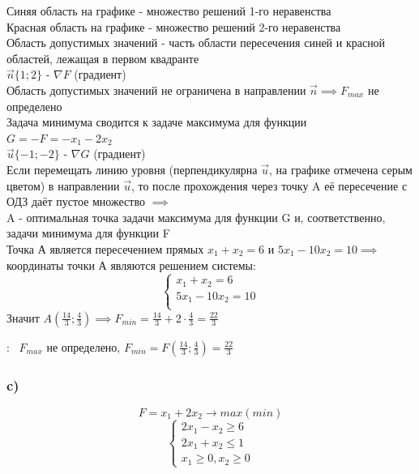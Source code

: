 \begin{flushleft}
    Синяя область на графике - множество решений 1-го неравенства\\
    Красная область на графике - множество решений 2-го неравенства\\
    Область допустимых значений - часть области пересечения синей и красной областей, лежащая в первом квадранте\\
    $\vec{n}\{1; 2\}$ - $\nabla F$ (градиент)\\
    Область допустимых значений не ограничена в направлении $\vec{n} \implies F_{max}$ не определено\\
    Задача минимума сводится к задаче максимума для функции $G = -F = -x_1 - 2x_2$ \\
    $\vec{u}\{-1; -2\}$ - $\nabla G$ (градиент)\\
    Если перемещать линию уровня (перпендикулярна $\vec{u}$, на графике отмечена серым цветом) в направлении $\vec{u}$, то после прохождения через точку A её пересечение с ОДЗ даёт пустое множество $\implies$ \\A - оптимальная точка задачи максимума для функции G и, соответственно, задачи минимума для функции F\\
    Точка А является пересечением прямых $x_1 + x_2 = 6$ и $5x_1 - 10x_2 = 10 \implies$ координаты точки А являются решением системы:\\
    \begin{equation*}
        \begin{cases}
            x_1 + x_2 = 6 \\
            5x_1 - 10x_2 = 10 \\
        \end{cases}
    \end{equation*}
    Значит $A(\frac{14}{3}; \frac{4}{3}) \implies F_{min} = \frac{14}{3} + 2\cdot\frac{4}{3} = \frac{22}{3}$
\end{flushleft}

{:~} $F_{max}$ не определено,  $F_{min} = F(\frac{14}{3}; \frac{4}{3}) = \frac{22}{3}$ 



\subsubsection{c)}
\begin{equation*}
    F = x_1 + 2x_2 \rightarrow max(min)
\end{equation*}
\begin{equation*}
    \begin{cases}
        2x_1 - x_2 \ge 6 \\
        2x_1 + x_2 \le 1 \\
        x_1 \ge 0, x_2 \ge 0
    \end{cases}
\end{equation*}

